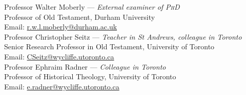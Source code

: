 \documentclass[11pt]{article}
\begin{document}
Professor Walter Moberly --- \emph{External examiner of \textsc{PhD}}\\
Professor of Old Testament, Durham University\\
Email: \href{mailto:r.w.l.moberly@durham.ac.uk}{r.w.l.moberly@durham.ac.uk}\\

Professor Christopher Seitz --- \emph{Teacher in St Andrews, colleague in Toronto}\\
Senior Research Professor in Old Testament, University of Toronto\\
Email: \href{mailto:CSeitz@wycliffe.utoronto.ca}{CSeitz@wycliffe.utoronto.ca}\\

Professor Ephraim Radner --- \emph{Colleague in Toronto}\\
Professor of Historical Theology, University of Toronto\\
Email: \href{mailto:e.radner@wycliffe.utoronto.ca}{e.radner@wycliffe.utoronto.ca}\\

\end{document}
